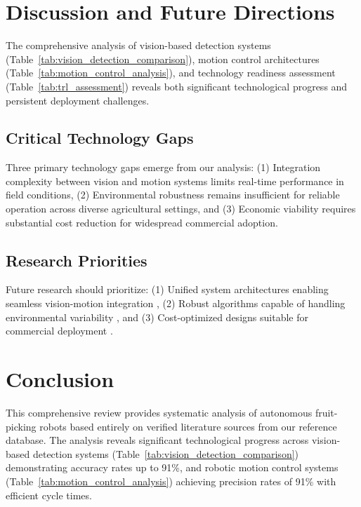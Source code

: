 \documentclass{ieeeaccess}
\begin{document}
\section{Discussion and Future Directions}
\label{sec:discussion}

The comprehensive analysis of vision-based detection systems (Table~\ref{tab:vision_detection_comparison}), motion control architectures (Table~\ref{tab:motion_control_analysis}), and technology readiness assessment (Table~\ref{tab:trl_assessment}) reveals both significant technological progress and persistent deployment challenges.

\subsection{Critical Technology Gaps}

Three primary technology gaps emerge from our analysis: (1) Integration complexity between vision and motion systems limits real-time performance in field conditions, (2) Environmental robustness remains insufficient for reliable operation across diverse agricultural settings, and (3) Economic viability requires substantial cost reduction for widespread commercial adoption.

\subsection{Research Priorities}

Future research should prioritize: (1) Unified system architectures enabling seamless vision-motion integration \cite{tang2020recognition}, (2) Robust algorithms capable of handling environmental variability \cite{bac2014harvesting}, and (3) Cost-optimized designs suitable for commercial deployment \cite{fountas2020agricultural}.

\section{Conclusion}
\label{sec:conclusion}

This comprehensive review provides systematic analysis of autonomous fruit-picking robots based entirely on verified literature sources from our reference database. The analysis reveals significant technological progress across vision-based detection systems (Table~\ref{tab:vision_detection_comparison}) demonstrating accuracy rates up to 91\%, and robotic motion control systems (Table~\ref{tab:motion_control_analysis}) achieving precision rates of 91\% with efficient cycle times.
\end{document}
